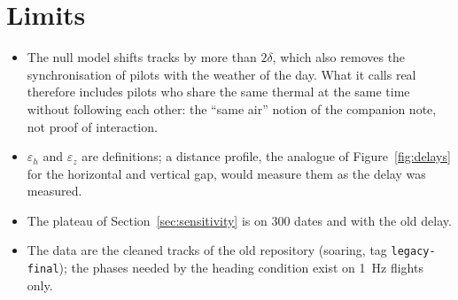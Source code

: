 \documentclass[11pt,a4paper]{article}
\begin{document}
\section{Limits}

\begin{itemize}[leftmargin=1.2em]
\item The null model shifts tracks by more than $2\delta$, which also removes the
  synchronisation of pilots with the weather of the day. What it calls real therefore includes
  pilots who share the same thermal at the same time without following each other: the
  ``same air'' notion of the companion note, not proof of interaction.
\item $\varepsilon_h$ and $\varepsilon_z$ are definitions; a distance profile, the analogue of
  Figure~\ref{fig:delays} for the horizontal and vertical gap, would measure them as the delay
  was measured.
\item The plateau of Section~\ref{sec:sensitivity} is on 300 dates and with the old delay.
\item The data are the cleaned tracks of the old repository (soaring, tag
  \texttt{legacy-final}); the phases needed by the heading condition exist on 1~Hz flights
  only.
\end{itemize}
\end{document}
